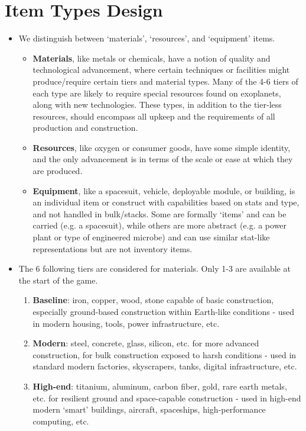 \documentclass{article}
\begin{document}
\section*{Item Types Design}
\begin{itemize}
    \item We distinguish between `materials', `resources', and `equipment' items.
    \begin{itemize}
        \item \textbf{Materials}, like metals or chemicals, have a notion of quality and technological advancement, where certain techniques or
            facilities might produce/require certain tiers and material types. Many of the 4-6 tiers of each type are likely to require special
            resources found on exoplanets, along with new technologies. These types, in addition to the tier-less resources, should
            encompass all upkeep and the requirements of all production and construction.
        \item \textbf{Resources}, like oxygen or consumer goods, have some simple identity, and the only advancement is in terms of the scale or ease at which they are produced.
        \item \textbf{Equipment}, like a spacesuit, vehicle, deployable module, or building, is an individual item or construct with capabilities based on
            stats and type, and not handled in bulk/stacks. Some are formally `items' and can be carried (e.g. a spacesuit), while
            others are more abstract (e.g. a power plant or type of engineered microbe) and can use similar stat-like representations
            but are not inventory items.
    \end{itemize}
    \item The 6 following tiers are considered for materials. Only 1-3 are available at the start of the game.
    \begin{enumerate}
        \item \textbf{Baseline}: iron, copper, wood, stone capable of basic construction, especially ground-based construction within Earth-like conditions - used in modern housing, tools, power infrastructure, etc.
        \item \textbf{Modern}: steel, concrete, glass, silicon, etc. for more advanced construction, for bulk construction exposed to harsh conditions - used in standard modern factories, skyscrapers, tanks, digital infrastructure, etc.
        \item \textbf{High-end}: titanium, aluminum, carbon fiber, gold, rare earth metals, etc. for resilient ground and space-capable construction - used in high-end modern `smart' buildings, aircraft, spaceships, high-performance computing, etc.

\end{enumerate}
\end{itemize}
\end{document}
